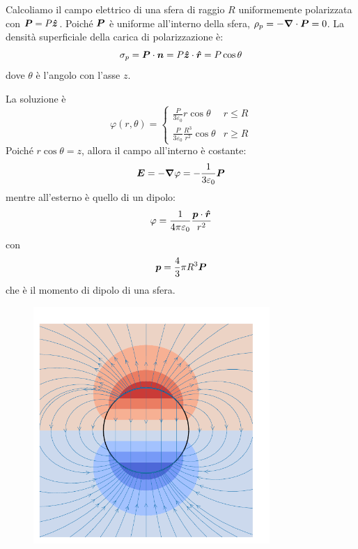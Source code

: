\begin{Es}
  Calcoliamo il campo elettrico di una sfera di raggio $R$ uniformemente polarizzata con $\boldsymbol{P}=P\boldsymbol{\hat {z}}$. Poiché $\boldsymbol{P}$ è uniforme all'interno della sfera, $\rho_p=-\boldsymbol{\nabla} \cdot\boldsymbol{P}=0$. La densità superficiale della carica di polarizzazione è:
  \[
    \sigma_p=\boldsymbol{P}\cdot\boldsymbol{n}=P \boldsymbol{\hat {z}}\cdot\boldsymbol{\hat {r}}=P \cos\theta
  \]
  dove $\theta$ è l'angolo con l'asse $z$.

  La soluzione è
  \[
    \varphi(r, \theta) = \begin{cases}
      \frac{P}{3\varepsilon_0}r \cos\theta              & r\leq R \\
      \frac{P}{3\varepsilon_0}\frac{R^3}{r^2}\cos\theta & r\geq R
    \end{cases}
  \]
  Poiché $r\cos\theta=z$, allora il campo all'interno è costante:
  \[
    \boldsymbol{E} = -\boldsymbol{\nabla} \varphi = -\frac{1}{3\varepsilon_0}\boldsymbol{P}
  \]
  mentre all'esterno è quello di un dipolo:
  \[
    \varphi = \frac{1}{4\pi \varepsilon_0}\frac{\boldsymbol{p}\cdot \boldsymbol{\hat {r}}}{r^2}
  \]
  con
  \[
    \boldsymbol{p} = \frac{4}{3}\pi R^3 \boldsymbol{P}
  \]
  che è il momento di dipolo di una sfera.
  \begin{figure}
    \centering
    \includegraphics[width=0.8\textwidth]{immagini/fisica2/sphere_polarized.pdf}
  \end{figure}
\end{Es}

